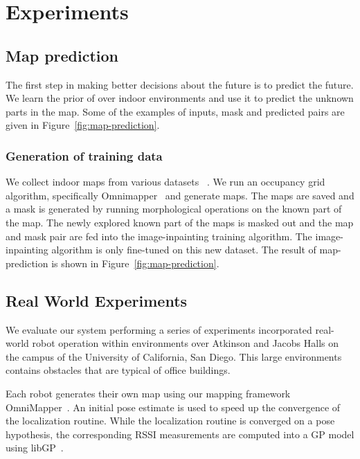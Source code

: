 

\section{Experiments}

\subsection{Map prediction}

The first step in making better decisions about the future is to predict the future.
We learn the prior of over indoor environments and use it to predict the unknown
parts in the map. Some of the examples of inputs, mask and predicted pairs are
given in Figure~\ref{fig:map-prediction}.

\subsubsection{Generation of training data}

We collect indoor maps from various datasets ~\cite{howard2003radish}.
We run an occupancy grid algorithm, specifically Omnimapper~\cite{Trevor14ICRA} and generate maps. 
The maps are saved and a mask is generated by running morphological operations
on the known part of the map.
The newly explored known part of the maps is masked out and the map and mask
pair are fed into the image-inpainting training algorithm.
The image-inpainting algorithm is only fine-tuned on this new dataset.
The result of map-prediction is shown in Figure~\ref{fig:map-prediction}.


\subsection{Real World Experiments}

We evaluate our system performing a series of experiments incorporated real-world robot operation within environments over Atkinson and Jacobs Halls on the campus of the University of California, San Diego.  This large environments contains obstacles that are typical of office buildings.

Each robot generates their own map using our mapping framework OmniMapper~\cite{Trevor14ICRA}. An initial pose estimate is used to speed up the convergence of the localization routine. While the localization routine is converged on a pose hypothesis, the corresponding RSSI measurements are computed into a GP model using  libGP~\cite{BlumLibGP}. 


